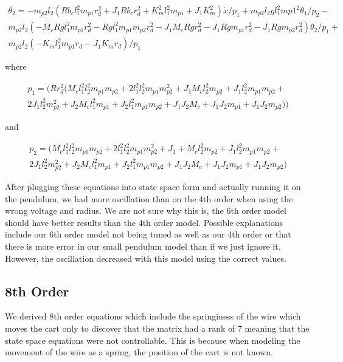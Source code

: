 \documentclass{article}
\begin{document}
\begin{multline} 
\label{eqn6th6}
\ddot{\theta_2} = -m_{p2} l_2 (R b_c l_1^2 m_{p1} r_d^2+J_1 R b_c r_d^2+K_m^2 l_1^2 m_{p1}+J_1 K_m^2)\dot{x}/p_1 +m_{p2} l_2 g l_1^2 m{p1}^2 \theta_1/p_2 - \\m_{p2} l_2 (-M_c R g l_1^2 m_{p1} r_d^2-R g l_1^2 m_{p1} m_{p2} r_d^2-J_1 M_c R g r_d^2-J_1 R g m_{p1} r_d^2-J_1 R g m_{p2} r_d^2) \theta_2/p_1 + \\m_{p2} l_2 (-K_m l_1^2 m_{p1} r_d-J_1 K_m r_d)/p_1
\end{multline}

where 

\begin{multline} 
\label{p1}
p_1 = (R r_d^2 (M_c l_1^2 l_2^2 m_{p1} m_{p2}+2 l_1^2 l_2^2 m_{p1} m_{p2}^2+J_1 M_c l_2^2 m_{p2}+J_1 l_2^2 m_{p1} m_{p2}+\\2 J_1 l_2^2 m_{p2}^2+J_2 M_c l_1^2 m_{p1}+J_2 l_1^2 m_{p1} m_{p2}+J_1 J_2 M_c+J_1 J_2 m_{p1}+J_1 J_2 m_{p2}))
\end{multline}

and 

\begin{multline*} 
\label{p2}
 p_2 = (M_c l_1^2 l_2^2 m_{p1}m_{p2}+2 l_1^2 l_2^2 m_{p1} m_{p2}^2+J_1+M_c l_2^2 m_{p2}+J_1 l_2^2 m_{p1} m_{p2}+\\2 J_1 l_2^2 m_{p2}^2+J_2 M_c l_1^2 m_{p1}+J_2 l_1^2 m_{p1} m_{p2}+J_1 J_2 M_c+J_1 J_2 m_{p1}+J_1 J_2 m_{p2})
\end{multline*}

After plugging these equations into state space form and actually running it on the pendulum, we had more oscillation than on the 4th order when using the wrong voltage and radius.  We are not sure why this is, the 6th order model should have better results than the 4th order model. Possible explanations include our 6th order model not being tuned as well as our 4th order or that there is more error in our small pendulum model than if we just ignore it. However, the oscillation decreased with this model using the correct values.

\subsection{8th Order}
We derived 8th order equations which include the springiness of the wire which moves the cart only to discover that the matrix had a rank of 7 meaning that the state space equations were not controllable. This is because when modeling the movement of the wire as a spring, the position of the cart is not known. 
\end{document}
